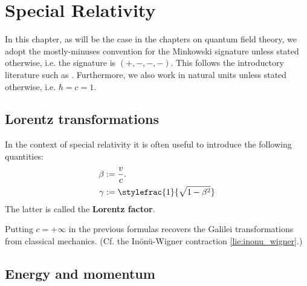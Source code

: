 \chapter{Special Relativity}

    In this chapter, as will be the case in the chapters on quantum field theory, we adopt the mostly-minuses convention for the Minkowski signature unless stated otherwise, i.e. the signature is $(+, -, -, -)$. This follows the introductory literature such as \cite{Peskin, greiner_qft}. Furthermore, we also work in natural units unless stated otherwise, i.e. $\hbar = c = 1$.

\section{Lorentz transformations}

    \begin{notation}
        In the context of special relativity it is often useful to introduce the following quantities:
        \begin{align}
            \beta &:= \frac{v}{c}.\\
            \label{rel:lorentz_factor}
            \gamma &:= \stylefrac{1}{\sqrt{1 - \beta^2}}
        \end{align}
        The latter is called the \textbf{Lorentz factor}.
    \end{notation}
    \begin{remark}
        Putting $c=+\infty$ in the previous formulas recovers the Galilei transformations from classical mechanics. (Cf. the In\"on\"u-Wigner contraction \ref{lie:inonu_wigner}.)
    \end{remark}

\section{Energy and momentum}

